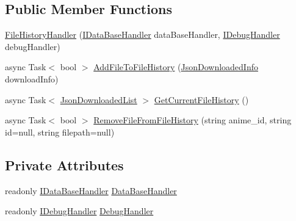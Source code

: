 \subsection*{Public Member Functions}
\begin{DoxyCompactItemize}
\item 
\mbox{\hyperlink{class_little_weeb_library_1_1_handlers_1_1_file_history_handler_ab8aa730a5d9db1b2624723394bd06191}{File\+History\+Handler}} (\mbox{\hyperlink{interface_little_weeb_library_1_1_handlers_1_1_i_data_base_handler}{I\+Data\+Base\+Handler}} data\+Base\+Handler, \mbox{\hyperlink{interface_little_weeb_library_1_1_handlers_1_1_i_debug_handler}{I\+Debug\+Handler}} debug\+Handler)
\item 
async Task$<$ bool $>$ \mbox{\hyperlink{class_little_weeb_library_1_1_handlers_1_1_file_history_handler_a615bf14eae35f656b211f0500abe4d29}{Add\+File\+To\+File\+History}} (\mbox{\hyperlink{class_little_weeb_library_1_1_models_1_1_json_downloaded_info}{Json\+Downloaded\+Info}} download\+Info)
\item 
async Task$<$ \mbox{\hyperlink{class_little_weeb_library_1_1_models_1_1_json_downloaded_list}{Json\+Downloaded\+List}} $>$ \mbox{\hyperlink{class_little_weeb_library_1_1_handlers_1_1_file_history_handler_a7e5a72e2cfdc3dfe97066cc7504b4445}{Get\+Current\+File\+History}} ()
\item 
async Task$<$ bool $>$ \mbox{\hyperlink{class_little_weeb_library_1_1_handlers_1_1_file_history_handler_a3b3f0cdedee405d607feff81c2de085d}{Remove\+File\+From\+File\+History}} (string anime\+\_\+id, string id=null, string filepath=null)
\end{DoxyCompactItemize}
\subsection*{Private Attributes}
\begin{DoxyCompactItemize}
\item 
readonly \mbox{\hyperlink{interface_little_weeb_library_1_1_handlers_1_1_i_data_base_handler}{I\+Data\+Base\+Handler}} \mbox{\hyperlink{class_little_weeb_library_1_1_handlers_1_1_file_history_handler_afe186c8ea770ecb9253a07f82f23c471}{Data\+Base\+Handler}}
\item 
readonly \mbox{\hyperlink{interface_little_weeb_library_1_1_handlers_1_1_i_debug_handler}{I\+Debug\+Handler}} \mbox{\hyperlink{class_little_weeb_library_1_1_handlers_1_1_file_history_handler_afeb86d3ea5c145f7dd6937f061679395}{Debug\+Handler}}
\end{DoxyCompactItemize}


